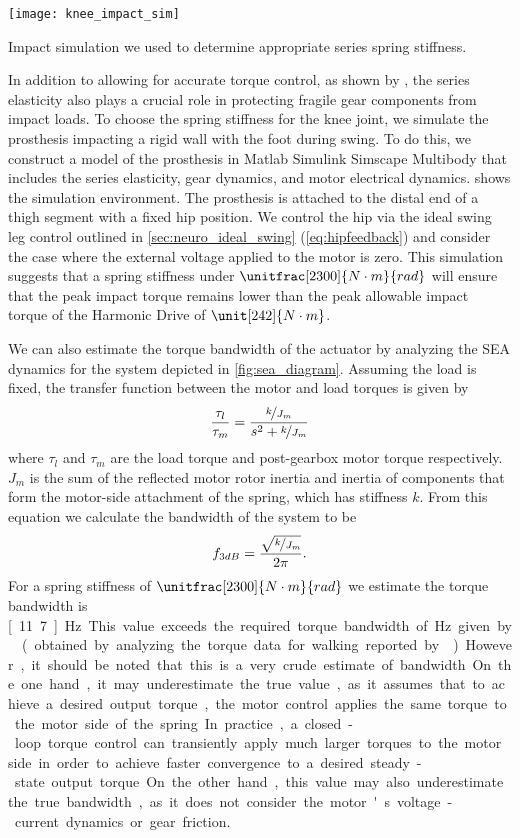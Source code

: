 \begin{marginfigure}[2.5in]
    \centering 
    \texttt{[image: knee\_impact\_sim]}
    \caption{Impact simulation we used to determine appropriate series spring
    stiffness.}\label{fig:knee_impact_sim}
\end{marginfigure}
In addition to allowing for accurate torque control, as shown by
\citet{au2007biomechanical,au2008powered}, the series elasticity also plays a
crucial role in protecting fragile gear components from impact loads. To choose
the spring stiffness for the knee joint, we simulate the prosthesis impacting a
rigid wall with the foot during swing. To do this, we construct a model of the
prosthesis in Matlab Simulink Simscape Multibody that includes the
series elasticity, gear dynamics, and motor electrical dynamics.
 shows the simulation environment. The prosthesis is
attached to the distal end of a thigh segment with a fixed hip position. We
control the hip via the ideal swing leg control outlined in
\cref{sec:neuro_ideal_swing} (\cref{eq:hipfeedback}) and consider the case where
the external voltage applied to the motor is zero. This simulation suggests that
a spring stiffness under $\unitfrac[2300]{N \cdot m}{rad}$ will ensure that the
peak impact torque remains lower than the peak allowable impact torque of the
Harmonic Drive of $\unit[242]{N \cdot m}$.

We can also estimate the torque bandwidth of the actuator by analyzing the SEA
dynamics for the system depicted in \cref{fig:sea_diagram}. Assuming the load is fixed, the transfer function between the motor
and load torques is given by
\begin{align}
    \frac{\tau_l}{\tau_m} = \frac{\nicefrac{k}{J_m}}{s^2 + \nicefrac{k}{J_m}}
\end{align}
where $\tau_l$ and $\tau_m$ are the load torque and post-gearbox motor torque
respectively. $J_m$ is the sum of the reflected motor rotor inertia and inertia
of components that form the motor-side attachment of the spring, which has
stiffness $k$. From this equation we calculate the bandwidth of the system
to be
\begin{align}
    f_{3 dB} = \frac{\sqrt{\nicefrac{k}{J_m}}}{2 \pi}.
\end{align}
For a spring stiffness of $\unitfrac[2300]{N \cdot m}{rad}$ we estimate the
torque bandwidth is \unit[11.7]{Hz}. This value exceeds the required torque
bandwidth of \unit[4]{Hz} given by \citet{sergi2012design} (obtained by
analyzing the torque data for walking reported by
\citet{winter2009biomechanics}). However, it should be noted that this is a very
crude estimate of bandwidth. On the one hand, it may underestimate the true
value, as it assumes that to achieve a desired output torque, the motor control
applies the same torque to the motor side of the spring. In practice, a
closed-loop torque control can transiently apply much larger torques to the
motor side in order to achieve faster convergence to a desired steady-state
output torque. On the other hand, this value may also underestimate the true
bandwidth, as it does not consider the motor's voltage-current dynamics or gear
friction.

